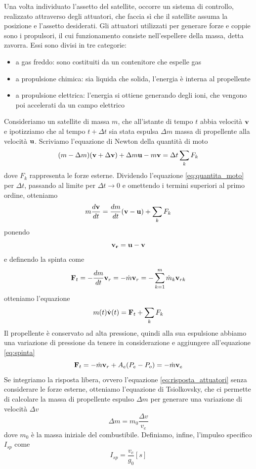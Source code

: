 Una volta individuato l'assetto del satellite, occorre un sistema di controllo,
realizzato attraverso degli attuatori, che faccia sì che il satellite assuma la
posizione e l'assetto desiderati.
Gli attuatori utilizzati per generare forze e coppie sono i propulsori, il cui
funzionamento consiste nell'espellere della massa, detta zavorra.
Essi sono divisi in tre categorie:
\begin{itemize}
  \item a gas freddo: sono costituiti da un contenitore che espelle gas
  \item a propulsione chimica: sia liquida che solida, l'energia è interna al
  propellente
  \item a propulsione elettrica: l'energia si ottiene generando degli ioni, che
  vengono poi accelerati da un campo elettrico
\end{itemize}
Consideriamo un satellite di massa $m$, che all'istante di tempo $t$ abbia
velocità ${\bf v}$ e ipotizziamo che al tempo $t+\Delta t$ sia stata espulsa
$\Delta m$ massa di propellente alla velocità ${\bf u}$. Scriviamo l'equazione
di Newton della quantità di moto
\begin{equation}
(m-\Delta m)({\bf v}+\Delta{\bf v})+\Delta m{\bf u}-m{\bf v}=\Delta t\sum_k F_k
\label{eq:quantita_moto}
\end{equation}
dove $F_k$ rappresenta le forze esterne.
Dividendo l'equazione \ref{eq:quantita_moto} per $\Delta t$, passando al limite
per $\Delta t\rightarrow 0$ e omettendo i termini superiori al primo ordine,
otteniamo
\begin{equation}
m\frac{d{\bf v}}{dt}=\frac{dm}{dt}({\bf v-u})+\sum_k F_k
\end{equation}
ponendo \[ {\bf v_r}={\bf u-v} \] e definendo la spinta come
\begin{equation}
{\bf F}_t=-\frac{dm}{dt}{\bf v}_r=-\dot{m}{\bf v}_r=-\sum_{k=1}^m
\dot{m}_k{\bf v}_{rk}
\label{eq:spinta}
\end{equation}
otteniamo l'equazione
\begin{equation}
m(t)\dot{\bf v}(t)={\bf F}_t+\sum_k F_k
\label{eq:risposta_attuatori}
\end{equation}
Il propellente è conservato ad alta pressione, quindi alla sua espulsione
abbiamo una variazione di pressione da tenere in considerazione e aggiungere
all'equazione \ref{eq:spinta}
\begin{equation}
{\bf F}_t=-\dot{m}{\bf v}_r+A_e(P_e-P_o)=-\dot{m}{\bf v}_e
\end{equation}
Se integriamo la risposta libera, ovvero l'equazione \ref{eq:risposta_attuatori}
senza considerare le forze esterne, otteniamo l'equazione di Tsiolkovsky, che ci
permette di calcolare la massa di propellente espulso $\Delta m$ per generare
una variazione di velocità $\Delta v$
\begin{equation}
\Delta m=m_0\frac{\Delta v}{v_e}
\end{equation}
dove $m_0$ è la massa iniziale del combustibile. Definiamo, infine, l'impulso
specifico $I_{sp}$ come \[ I_{sp}=\frac{v_e}{g_0}[s] \]


